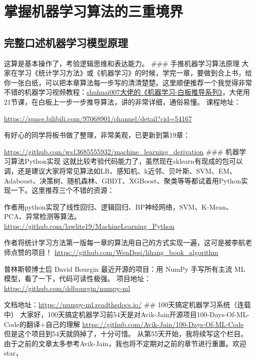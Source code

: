 \documentclass[
]{book}
\begin{document}
\hypertarget{ux638cux63e1ux673aux5668ux5b66ux4e60ux7b97ux6cd5ux7684ux4e09ux91cdux5883ux754c}{%
\section{掌握机器学习算法的三重境界}\label{ux638cux63e1ux673aux5668ux5b66ux4e60ux7b97ux6cd5ux7684ux4e09ux91cdux5883ux754c}}

\hypertarget{ux5b8cux6574ux53e3ux8ff0ux673aux5668ux5b66ux4e60ux6a21ux578bux539fux7406}{%
\subsection{完整口述机器学习模型原理}\label{ux5b8cux6574ux53e3ux8ff0ux673aux5668ux5b66ux4e60ux6a21ux578bux539fux7406}}

这算是基本操作了，考验逻辑思维和表达能力。
\#\#\# 手推机器学习算法原理
大家在学习《统计学习方法》或《机器学习》的时候，学完一章，要做到合上书，给你一张白纸，可以把本章算法每一步写的清清楚楚。这里顺便推荐一个我觉得非常不错的机器学习视频教程：\href{https://mp.weixin.qq.com/s?__biz=MzA4MjYwMTc5Nw==\&mid=2648931339\&idx=1\&sn=6ad6da4f380acadc25d8c511364c94f0\&chksm=8794ee21b0e367376bd7f2e72fbc89642bc4c524dc57546bbe5f3719f8abd09bea0cbbd69fda\&token=2004915986\&lang=en_US\#rd}{shuhuai007大佬的《机器学习-白板推导系列》}，大佬用21节课，在白板上一步一步推导算法，讲的非常详细，通俗易懂。
课程地址：

\url{https://space.bilibili.com/97068901/channel/detail?cid=54167}

有好心的同学将板书做了整理，非常美观，已更新到第19章：

\url{https://github.com/ws13685555932/machine_learning_derivation}
\#\#\# 机器学习算法Python实现
这就比较考验代码能力了，虽然现在sklearn有现成的包可以调，还是建议大家将常见算法如LR、感知机、k近邻、贝叶斯、SVM、EM、Adaboost、决策树、随机森林、GBDT、XGBoost、聚类等等都试着用Python实现一下。这里推荐三个不错的资源：

作者用python实现了线性回归、逻辑回归、BP神经网络，SVM、K-Mean、PCA、异常检测等算法。
\url{https://github.com/lawlite19/MachineLearning_Python}

作者将统计学习方法第一版每一章的算法用自己的方式实现一遍，这可是被李航老师点赞的项目！
\url{https://github.com/WenDesi/lihang_book_algorithm}

普林斯顿博士后 David Bourgin 最近开源的项目：用 NumPy 手写所有主流 ML 模型，看了一下，代码可读性极强。
项目地址：\url{https://github.com/ddbourgin/numpy-ml}

文档地址：\url{https://numpy-ml.readthedocs.io/}
\#\# 100天搞定机器学习系统（连载中）
大家好，100天搞定机器学习前54天是对Avik-Jain开源项目100-Days-Of-ML-Code的翻译+自己的理解 \url{https://github.com/Avik-Jain/100-Days-Of-ML-Code} 但是这个项目到54天就鸽掉了，十分可惜。
从第55天开始，我将续写这个栏目。 由于之前的文章太多参考Avik-Jain，我也将不定期对之前的章节进行重置。欢迎star，
\end{document}
